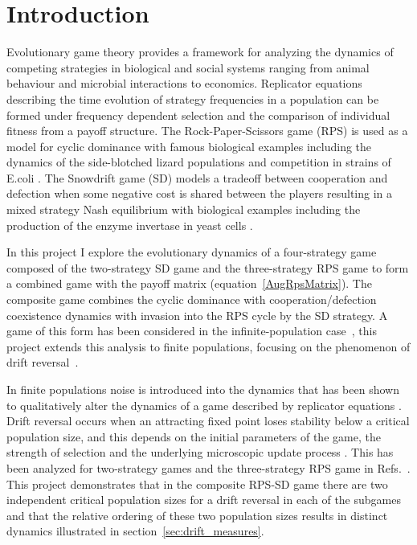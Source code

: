 \documentclass[%
 reprint,
 amsmath,amssymb,
 aps,
]{revtex4-2}
\begin{document}

\section{\label{sec:level1}Introduction}


Evolutionary game theory provides a framework for analyzing the dynamics of 
competing strategies in biological and social systems ranging from animal behaviour \cite{rps_lizard} and
microbial interactions \cite{cheating_microbes,yeast_snowdrift} to economics.
Replicator equations \cite{evolution_pop_dynamics,evolution_maynard} describing the 
time evolution of strategy frequencies in a population can be formed under frequency dependent selection 
and the comparison of individual fitness from a payoff structure. The Rock-Paper-Scissors game (RPS)
is used as a model for cyclic dominance with famous biological examples including the 
dynamics of the side-blotched lizard populations \cite{rps_lizard} and competition in strains of E.coli \cite{rps_ecoli}.
The Snowdrift game (SD) models a tradeoff between cooperation and defection when some negative cost is shared between 
the players resulting in a mixed strategy Nash equilibrium \cite{evolution_maynard} with biological examples including 
the production of the enzyme invertase in yeast cells \cite{yeast_snowdrift}. 

In this project I explore the evolutionary dynamics of a four-strategy
game composed of the two-strategy SD game and the three-strategy RPS game 
to form a combined game with the payoff matrix (equation~\ref{AugRpsMatrix}).
The composite game combines the cyclic dominance with cooperation/defection coexistence dynamics
with invasion into the RPS cycle by the SD strategy. A game of this form has been considered 
in the infinite-population case~\cite{evolution_pop_dynamics}, this project extends this analysis to
finite populations, focusing on the phenomenon of drift reversal~\cite{drift_reversal_paper}.

In finite populations noise is introduced into the dynamics that has been shown 
to qualitatively alter the dynamics of a game described 
by replicator equations \cite{drift_reversal_paper,Claussen2007-zo,rps_cyclic_jens,general_moran_process}.
Drift reversal occurs when an attracting fixed point loses stability below a critical population size, 
and this depends on the initial parameters of the game, the strength of selection and the underlying
microscopic update process \cite{drift_reversal_paper}. This has been analyzed for 
two-strategy games and the three-strategy RPS game in Refs.~\cite{rps_cyclic_jens,drift_reversal_paper}.
This project demonstrates that in the composite RPS-SD game there are two independent critical population sizes
for a drift reversal in each of the subgames and that the relative ordering of these two population sizes 
results in distinct dynamics illustrated in section~\ref{sec:drift_measures}.
\end{document}
